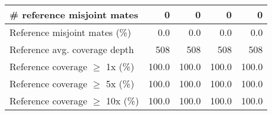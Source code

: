 \documentclass[12pt,a4paper]{article}
\begin{document}
\begin{table}[ht]
\begin{center}
\begin{tabular}{|l*{4}{|r}|}
\# reference misjoint mates & 0 & 0 & 0 & 0 \\ \hline
Reference misjoint mates (\%) & 0.0 & 0.0 & 0.0 & 0.0 \\ \hline
Reference avg. coverage depth & 508 & 508 & 508 & 508 \\ \hline
Reference coverage $\geq$ 1x (\%) & 100.0 & 100.0 & 100.0 & 100.0 \\ \hline
Reference coverage $\geq$ 5x (\%) & 100.0 & 100.0 & 100.0 & 100.0 \\ \hline
Reference coverage $\geq$ 10x (\%) & 100.0 & 100.0 & 100.0 & 100.0 \\ \hline
\end{tabular}
\end{center}
\end{table}
\end{document}
